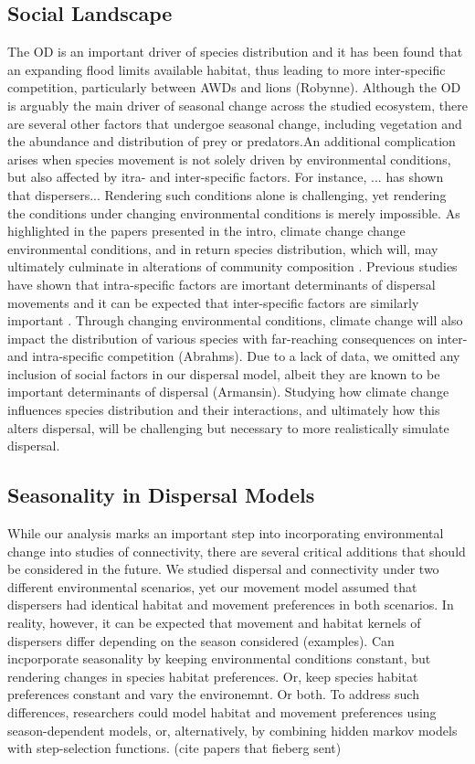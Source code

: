 \documentclass[abstract=on,10pt,a4paper,bibliography=totocnumbered]{article}
\begin{document}
\subsection{Social Landscape}
The OD is an important driver of species distribution and it has been found that
an expanding flood limits available habitat, thus leading to more inter-specific
competition, particularly between AWDs and lions (Robynne).
Although the OD is arguably the main driver of seasonal change across the
studied ecosystem, there are several other factors that undergoe seasonal
change, including vegetation and the abundance and distribution of prey or
predators.An additional complication arises when species movement is not solely driven by
environmental conditions, but also affected by itra- and inter-specific factors.
For instance, ... has shown that dispersers...
Rendering such conditions alone is challenging, yet rendering the conditions
under changing environmental conditions is merely impossible.
As highlighted in the papers presented in the intro, climate change change
environmental conditions, and in return species distribution, which will, may
ultimately culminate in alterations of community composition
\citep{Thuiller.2006}. Previous studies have shown that intra-specific factors
are imortant determinants of dispersal movements \citep{Cozzi.2018} and it can
be expected that inter-specific factors are similarly important
\citep{Armansin.2019}. Through changing environmental conditions, climate change
will also impact the distribution of various species with far-reaching
consequences on inter- and intra-specific competition (Abrahms). Due to a lack
of data, we omitted any inclusion of social factors in our dispersal model,
albeit they are known to be important determinants of dispersal (Armansin).
Studying how climate change influences species distribution and their
interactions, and ultimately how this alters dispersal, will be challenging but
necessary to more realistically simulate dispersal.

\subsection{Seasonality in Dispersal Models}
While our analysis marks an important step into incorporating environmental
change into studies of connectivity, there are several critical additions that
should be considered in the future. We studied dispersal and connectivity under
two different environmental scenarios, yet our movement model assumed that
dispersers had identical habitat and movement preferences in both scenarios. In
reality, however, it can be expected that movement and habitat kernels of
dispersers differ depending on the season considered (examples).
Can incporporate seasonality by keeping environmental conditions constant, but
rendering changes in species habitat preferences. Or, keep species habitat
preferences constant and vary the environemnt. Or both. To address such
differences, researchers could model habitat and movement preferences using
season-dependent models, or, alternatively, by combining hidden markov models
with step-selection functions. (cite papers that fieberg sent)
\end{document}
